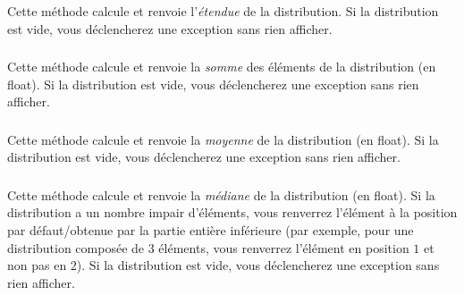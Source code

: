 \subsubsection*{}

\noindent Cette méthode calcule et renvoie l'\textit{étendue} de la distribution.
Si la distribution est vide, vous déclencherez une exception  sans rien afficher.



\subsubsection*{}

\noindent Cette méthode calcule et renvoie la \textit{somme} des éléments de la distribution (en float).
Si la distribution est vide, vous déclencherez une exception  sans rien afficher.


\subsubsection*{}

\noindent Cette méthode calcule et renvoie la \textit{moyenne} de la distribution (en float).
Si la distribution est vide, vous déclencherez une exception  sans rien afficher.


\subsubsection*{}

\noindent Cette méthode calcule et renvoie la \textit{médiane} de la distribution (en float).
Si la distribution a un nombre impair d'éléments, vous renverrez l'élément à la position par défaut/obtenue par la partie entière inférieure (par exemple, pour une distribution composée de $ 3 $ éléments, vous renverrez l'élément en position $ 1 $ et non pas en $ 2 $).
Si la distribution est vide, vous déclencherez une exception  sans rien afficher.


